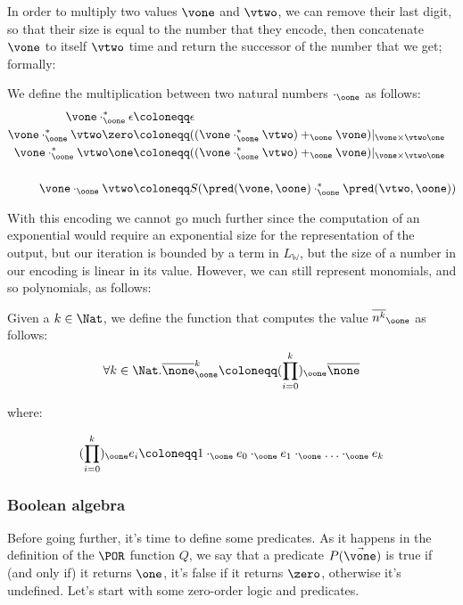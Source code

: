In order to multiply two values $\vone$ and $\vtwo$, we can remove their last digit, so that their size is equal to the number that they encode, then concatenate $\vone$ to itself $\vtwo$ time and return the successor of the number that we get; formally:
\begin{defn}

We define the multiplication between two natural numbers $\cdot_\oone$ as follows:
\begin{align*}
\vone \cdot_\oone^* \epsilon &\coloneqq \epsilon\\
\vone \cdot_\oone^* \vtwo\zero &\coloneqq ((\vone \cdot_\oone^* \vtwo) +_\oone \vone)|_{\vone \times \vtwo\one}\\
\vone \cdot_\oone^* \vtwo\one &\coloneqq ((\vone \cdot_\oone^* \vtwo) +_\oone \vone)|_{\vone \times \vtwo\one}\\\\
\vone \cdot_\oone \vtwo &\coloneqq S(\pred(\vone, \oone) \cdot_\oone^* \pred(\vtwo, \oone))
\end{align*}

\end{defn}
With this encoding we cannot go much further since the computation of an exponential would require an exponential size for the representation of the output, but our iteration is bounded by a term in $L_\mathbb{W}$, but the size of a number in our encoding is linear in its value. However, we can still represent monomials, and so polynomials, as follows:

\begin{defn}[Monomials]
Given a $k \in \Nat$, we define the function that computes the value $\overline {n^k}_\oone$ as follows:
\begin{align*}
\forall k \in \Nat. \overline \none_\oone^k \coloneqq (\prod_{i=0}^k)_\oone \overline \none
\end{align*}

where:

\[
(\prod_{i=0}^k)_\oone e_i \coloneqq 1 \cdot_\oone e_0 \cdot_\oone e_1 \cdot_\oone \ldots \cdot_\oone e_k
\]

\end{defn}
\subsubsection{Boolean algebra}
\label{sec:booleanalgebra}


Before going further, it's time to define some predicates. As it happens in the definition of the $\POR$ function $Q$, we say that a predicate \(P (\vec \vone)\) is true if (and only if) it returns \(\one\), it's false if it returns $\zero$, otherwise it's undefined. Let's start with some zero-order logic and predicates.

